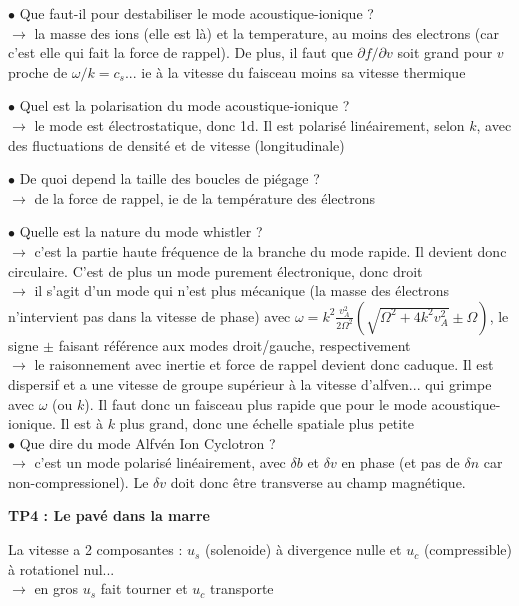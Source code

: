 \documentclass[10pt]{letter}
\begin{document}
$\bullet$ Que faut-il pour destabiliser le mode acoustique-ionique ? \\
$\rightarrow$ la masse des ions (elle est là) et la temperature, au moins des electrons (car c'est elle qui fait la force de rappel). De plus, il faut que $\partial f/ \partial v$ soit grand pour $v$ proche de $\omega/k = c_s$... ie à la vitesse du faisceau moins sa vitesse thermique

$\bullet$ Quel est la polarisation du mode acoustique-ionique ? \\
$\rightarrow$ le mode est électrostatique, donc 1d. Il est polarisé linéairement, selon $k$, avec des fluctuations de densité et de vitesse (longitudinale)

$\bullet$ De quoi depend la taille des boucles de piégage ? \\
$\rightarrow$ de la force de rappel, ie de la température des électrons

$\bullet$ Quelle est la nature du mode whistler ? \\
$\rightarrow$ c'est la partie haute fréquence de la branche du mode rapide. Il devient donc circulaire. C'est de plus un mode purement électronique, donc droit \\
$\rightarrow$ il s'agit d'un mode qui n'est plus mécanique (la masse des électrons n'intervient pas dans la vitesse de phase) avec $\omega = k^2 \frac{v_A^2}{2 \Omega^2} (\sqrt{\Omega^2+ 4 k^2 v_A^2} \pm \Omega)$, le signe $\pm$ faisant référence aux modes droit/gauche, respectivement \\
$\rightarrow$ le raisonnement avec inertie et force de rappel devient donc caduque. Il est dispersif et a une vitesse de groupe supérieur à la vitesse d'alfven... qui grimpe avec $\omega$ (ou $k$). Il faut donc un faisceau plus rapide que pour le mode acoustique-ionique. Il est à $k$ plus grand, donc une échelle spatiale plus petite \\

$\bullet$ Que dire du mode  Alfvén Ion Cyclotron ? \\
$\rightarrow$ c'est un mode polarisé linéairement, avec $\delta b$ et $\delta v$ en phase (et pas de $\delta n$ car non-compressionel). Le $\delta v$ doit donc être transverse au champ magnétique.

\newpage

{\bf TP4 : Le pavé dans la marre}

La vitesse a 2 composantes : $u_s$ (solenoide) à divergence nulle et $u_c$ (compressible) à rotationel nul... \\
$\to$ en gros $u_s$ fait tourner et $u_c$ transporte
\end{document}
